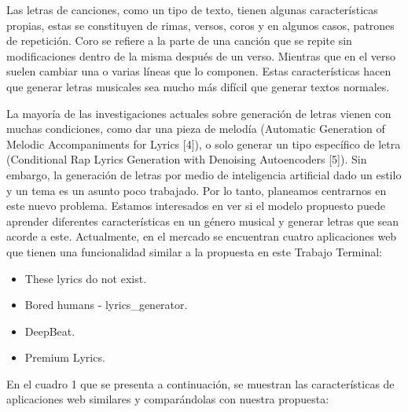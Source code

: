 \documentclass[12pt, a4paper, titlepage]{report}
\begin{document}
    Las letras de canciones, como un tipo de texto, tienen algunas características propias, estas se constituyen de rimas, versos, coros y en algunos casos, patrones de repetición. Coro se refiere a la parte de una canción que se repite sin modificaciones dentro de la misma después de un verso. Mientras que en el verso suelen cambiar una o varias líneas que lo componen. Estas características hacen que generar letras musicales sea mucho más difícil que generar textos normales.\par
    
    La mayoría de las investigaciones actuales sobre generación de letras vienen con muchas condiciones, como dar una pieza de melodía (Automatic Generation of Melodic Accompaniments for Lyrics [4]), o solo generar un tipo específico de letra (Conditional Rap Lyrics Generation with Denoising Autoencoders [5]). Sin embargo, la generación de letras por medio de inteligencia artificial dado un estilo y un tema es un asunto poco trabajado. Por lo tanto, planeamos centrarnos en este nuevo problema. Estamos interesados en ver si el modelo propuesto puede aprender diferentes características en un género musical y generar letras que sean acorde a este. Actualmente, en el mercado se encuentran cuatro aplicaciones web que tienen una funcionalidad similar a la propuesta en este Trabajo Terminal:\par
    
    \begin{itemize}
    	\item These lyrics do not exist.
    	\item Bored humans - lyrics\_generator.
    	\item DeepBeat.
    	\item Premium Lyrics.
    \end{itemize}
\newpage
	En el cuadro 1 que se presenta a continuación, se muestran las características de aplicaciones web similares y comparándolas con nuestra propuesta:
\end{document}
